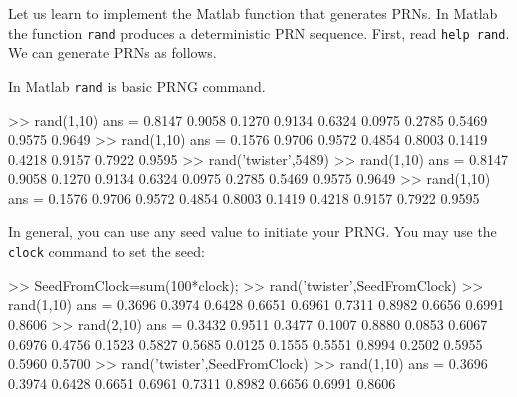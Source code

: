 Let us learn to implement the {\sc Matlab} function that generates PRNs.  In {\sc Matlab} the function {\tt rand} produces a deterministic PRN sequence.  First, read {\tt help rand}.  We can generate PRNs as follows.
\begin{labwork}\label{LW:RNGMatlab}
In {\sc Matlab} {\tt rand} is basic PRNG command.
\begin{VrbM}
>> rand(1,10) %
ans =
    0.8147    0.9058    0.1270    0.9134    0.6324    0.0975    0.2785    0.5469    0.9575    0.9649
>> rand(1,10) %
ans =
    0.1576    0.9706    0.9572    0.4854    0.8003    0.1419    0.4218    0.9157    0.7922    0.9595
>> rand('twister',5489) %
>> rand(1,10) %
ans =
    0.8147    0.9058    0.1270    0.9134    0.6324    0.0975    0.2785    0.5469    0.9575    0.9649
>> rand(1,10) %
ans =
    0.1576    0.9706    0.9572    0.4854    0.8003    0.1419    0.4218    0.9157    0.7922    0.9595
\end{VrbM}  
In general, you can use any seed value to initiate your PRNG.  You may use the {\tt clock} command to set the seed:
\begin{VrbM}
>> SeedFromClock=sum(100*clock); %
>> rand('twister',SeedFromClock) %
>> rand(1,10)
ans =
    0.3696    0.3974    0.6428    0.6651    0.6961    0.7311    0.8982    0.6656    0.6991    0.8606
>> rand(2,10)
ans =
    0.3432    0.9511    0.3477    0.1007    0.8880    0.0853    0.6067    0.6976    0.4756    0.1523
    0.5827    0.5685    0.0125    0.1555    0.5551    0.8994    0.2502    0.5955    0.5960    0.5700
>> rand('twister',SeedFromClock) %
>> rand(1,10)
ans =
    0.3696    0.3974    0.6428    0.6651    0.6961    0.7311    0.8982    0.6656    0.6991    0.8606
\end{VrbM}
\end{labwork}
 
